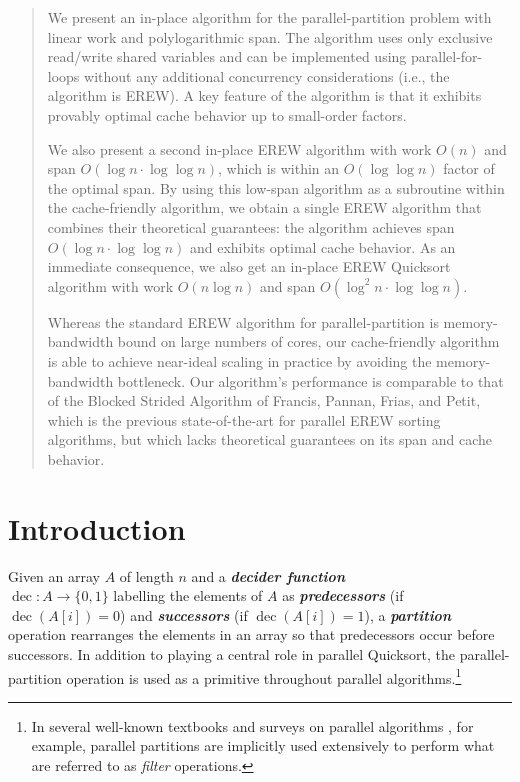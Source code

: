 \documentclass[sigconf, 10pt, nonacm]{acmart}
\newcommand{\dec}{\operatorname{dec}}
\newcommand{\defn}[1]{{\textit{\textbf{\boldmath #1}}}}
\theoremstyle{remark}
\theoremstyle{remark}
\begin{document}
\thispagestyle{fancy}
\begin{abstract}
We present an in-place algorithm for the parallel-partition problem
with linear work and polylogarithmic span. The algorithm uses only
exclusive read/write shared variables and can be implemented using
parallel-for-loops without any additional concurrency considerations
(i.e., the algorithm is EREW). A key feature of the algorithm is that
it exhibits provably optimal cache behavior up to small-order factors.

We also present a second in-place EREW algorithm with work $O(n)$ and span
$O(\log n \cdot \log \log n)$, which is within an $O(\log\log n)$ factor of the
optimal span. By using this low-span algorithm as a subroutine within the
cache-friendly algorithm, we obtain a single EREW algorithm that combines their
theoretical guarantees: the algorithm achieves span $O(\log n \cdot \log \log
n)$ and exhibits optimal cache behavior. As an immediate consequence, we also
get an in-place EREW Quicksort algorithm with work $O(n \log n)$ and span
$O(\log^2 n \cdot \log \log n)$.

Whereas the standard EREW algorithm for parallel-partition is
memory-bandwidth bound on large numbers of cores, our cache-friendly
algorithm is able to achieve near-ideal scaling in practice by
avoiding the memory-bandwidth bottleneck. Our algorithm's performance
is comparable to that of the Blocked Strided Algorithm of Francis,
Pannan, Frias, and Petit, which is the previous state-of-the-art for
parallel EREW sorting algorithms, but which lacks theoretical
guarantees on its span and cache behavior.
\end{abstract}
\maketitle

\section{Introduction}

Given an array $A$ of length $n$ and a \defn{decider function} \\$\dec: A \to \{0, 1\}$
labelling the elements of $A$ as \defn{predecessors} (if $\dec(A[i])=0$) and
\defn{successors} (if $\dec(A[i])=1$), a \defn{partition} operation rearranges the
elements in an array so that predecessors occur before successors. In addition
to playing a central role in parallel Quicksort, the parallel-partition
operation is used as a primitive throughout parallel algorithms.\footnote{In
  several well-known textbooks and surveys on parallel algorithms
\cite{AcarBl16,Blelloch96}, for example, parallel partitions are implicitly
used extensively to perform what are referred to as \emph{filter} operations.}
\end{document}
